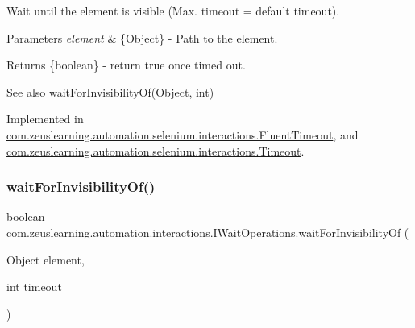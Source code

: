 Wait until the element is visible (Max. timeout = default timeout).


\begin{DoxyParams}{Parameters}
{\em element} & \{Object\} -\/ Path to the element.\\
\hline
\end{DoxyParams}
\begin{DoxyReturn}{Returns}
\{boolean\} -\/ return {\ttfamily true} once timed out.
\end{DoxyReturn}
\begin{DoxySeeAlso}{See also}
\hyperlink{interfacecom_1_1zeuslearning_1_1automation_1_1interactions_1_1IWaitOperations_a816b3d7ef80895d1cf54cc657a10204e}{wait\+For\+Invisibility\+Of(\+Object, int)} 
\end{DoxySeeAlso}


Implemented in \hyperlink{classcom_1_1zeuslearning_1_1automation_1_1selenium_1_1interactions_1_1FluentTimeout_ad385151878bb0bd5e034cb4769c206f5}{com.\+zeuslearning.\+automation.\+selenium.\+interactions.\+Fluent\+Timeout}, and \hyperlink{classcom_1_1zeuslearning_1_1automation_1_1selenium_1_1interactions_1_1Timeout_adefb45ce06aba9bedc30a707f41ebe3f}{com.\+zeuslearning.\+automation.\+selenium.\+interactions.\+Timeout}.

\hypertarget{interfacecom_1_1zeuslearning_1_1automation_1_1interactions_1_1IWaitOperations_a816b3d7ef80895d1cf54cc657a10204e}{}\label{interfacecom_1_1zeuslearning_1_1automation_1_1interactions_1_1IWaitOperations_a816b3d7ef80895d1cf54cc657a10204e} 
\subsubsection{\texorpdfstring{wait\+For\+Invisibility\+Of()}{waitForInvisibilityOf()}\hspace{0.1cm}{\footnotesize\ttfamily [2/2]}}
{\footnotesize\ttfamily boolean com.\+zeuslearning.\+automation.\+interactions.\+I\+Wait\+Operations.\+wait\+For\+Invisibility\+Of (\begin{DoxyParamCaption}\item[{Object}]{element,  }\item[{int}]{timeout }\end{DoxyParamCaption})}

